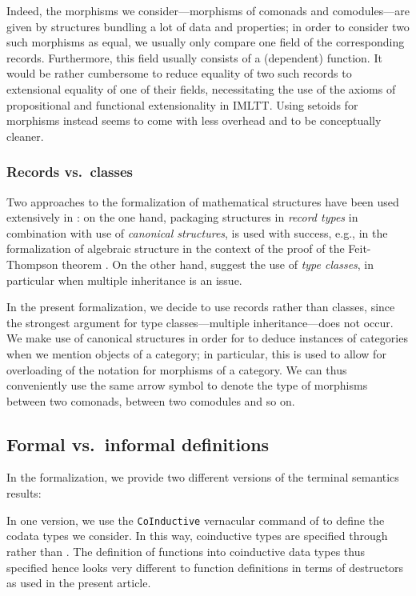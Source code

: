 \documentclass[envcountsame]{llncs}
\begin{document}
\begin{Long}
Indeed, the morphisms we consider---morphisms of comonads and comodules---are given by structures
bundling a lot of data and properties; in order to consider two such morphisms as equal, we usually only compare one field of the 
corresponding records. Furthermore, this field usually consists of a (dependent) function.
It would be rather cumbersome to reduce equality of two such records to extensional equality of one of their fields, 
necessitating the use of the axioms of propositional and functional extensionality in IMLTT.
Using setoids for morphisms instead seems to come with less overhead and to be conceptually cleaner.



\subsubsection{Records vs.\ classes}
Two approaches to the formalization of mathematical structures have been used extensively in \coq: on the one hand, packaging structures
in \emph{record types}  in combination with use of \emph{canonical structures}, is used with success, e.g., in 
the formalization of algebraic structure in the context of the proof of the Feit-Thompson theorem \parencite{DBLP:conf/tphol/GarillotGMR09}.
On the other hand, \textcite{DBLP:journals/mscs/SpittersW11} suggest the use of \emph{type classes}, in particular when multiple inheritance
is an issue.

In the present formalization, we decide to use records rather than classes, since the strongest argument for type classes---multiple inheritance---does 
not occur.
We make use of canonical structures in order for \coq to deduce instances of categories when we mention objects of a category; 
in particular, this is used to allow for overloading of the notation for morphisms of a category.
We can thus conveniently use the same arrow symbol to denote the type of morphisms between two comonads, between two comodules and so on.


\subsection{Formal vs.\ informal definitions}

In the \coq formalization, we provide two different versions of the terminal semantics results:

In one version, we use the \lstinline!CoInductive! vernacular command of \coq to define the codata types we consider.
In this way, coinductive types are specified through  rather than . The definition
of functions into coinductive data types thus specified hence looks very different to function definitions 
in terms of destructors as used in the present article.


\end{Long}
\end{document}
